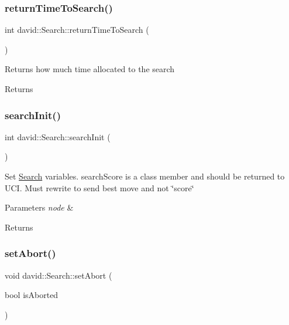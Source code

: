 \subsubsection{\texorpdfstring{return\+Time\+To\+Search()}{returnTimeToSearch()}}
{\footnotesize\ttfamily int david\+::\+Search\+::return\+Time\+To\+Search (\begin{DoxyParamCaption}{ }\end{DoxyParamCaption})}

Returns how much time allocated to the search \begin{DoxyReturn}{Returns}

\end{DoxyReturn}
\mbox{\label{classdavid_1_1Search_a2369363341b57c68fcef39a5be57221b}} 
\subsubsection{\texorpdfstring{search\+Init()}{searchInit()}}
{\footnotesize\ttfamily int david\+::\+Search\+::search\+Init (\begin{DoxyParamCaption}{ }\end{DoxyParamCaption})}

Set \hyperlink{classdavid_1_1Search}{Search} variables. search\+Score is a class member and should be returned to U\+CI. Must rewrite to send best move and not \char`\"{}score\char`\"{} 
\begin{DoxyParams}{Parameters}
{\em node} & \\
\hline
\end{DoxyParams}
\begin{DoxyReturn}{Returns}

\end{DoxyReturn}
\mbox{\label{classdavid_1_1Search_acdd60c4222d2c63d07e8576faf5a34fd}} 
\subsubsection{\texorpdfstring{set\+Abort()}{setAbort()}}
{\footnotesize\ttfamily void david\+::\+Search\+::set\+Abort (\begin{DoxyParamCaption}\item[{bool}]{is\+Aborted }\end{DoxyParamCaption})}

